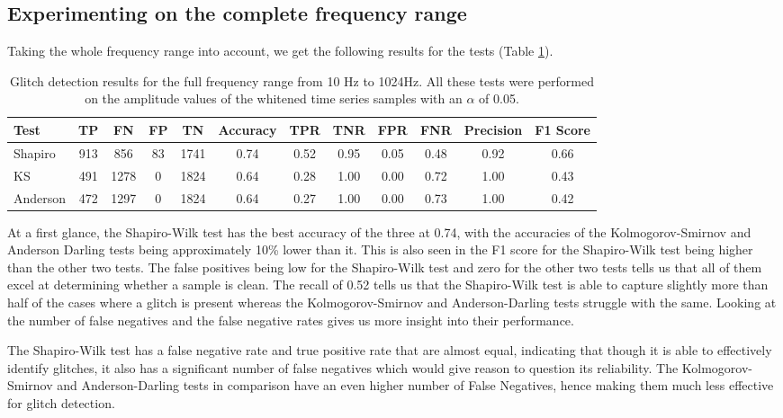 \documentclass[12pt]{article}
\begin{document}
\pagebreak

\subsection{Experimenting on the complete frequency range}\label{Experiment_1}

Taking the whole frequency range into account, we get the following results for the tests (Table \ref{tab:full_range_results}).

\begin{table}[H]
  \centering
  \begin{tabular}{lccccccccccc}
  \toprule
  Test & TP & FN & FP & TN & Accuracy & TPR & TNR & FPR & FNR & Precision & F1 Score \\
  \midrule
  Shapiro & 913 & 856 & 83 & 1741 & 0.74 & 0.52 & 0.95 & 0.05 & 0.48 & 0.92 & 0.66 \\
  KS & 491 & 1278 & 0 & 1824 & 0.64 & 0.28 & 1.00 & 0.00 & 0.72 & 1.00 & 0.43 \\
  Anderson & 472 & 1297 & 0 & 1824 & 0.64 & 0.27 & 1.00 & 0.00 & 0.73 & 1.00 & 0.42 \\
  \bottomrule
  \end{tabular}
  \caption{Glitch detection results for the full frequency range from 10 Hz to 1024Hz. All these tests were performed on the amplitude values of the whitened time series samples with an $\alpha$ of 0.05.}
  \label{tab:full_range_results}
\end{table}

\noindent At a first glance, the Shapiro-Wilk test has the best accuracy of the three at 0.74, with the accuracies of the Kolmogorov-Smirnov and Anderson Darling tests being approximately 10\% lower than it. This is also seen in the F1 score for the Shapiro-Wilk test being higher than the other two tests. The false positives being low for the Shapiro-Wilk test and zero for the other two tests tells us that all of them excel at determining whether a sample is clean. The recall of 0.52 tells us that the Shapiro-Wilk test is able to capture slightly more than half of the cases where a glitch is present whereas the Kolmogorov-Smirnov and Anderson-Darling tests struggle with the same. Looking at the number of false negatives and the false negative rates gives us more insight into their performance.

\medskip
\noindent The Shapiro-Wilk test has a false negative rate and true positive rate that are almost equal, indicating that though it is able to effectively identify glitches, it also has a significant number of false negatives which would give reason to question its reliability. The Kolmogorov-Smirnov and Anderson-Darling tests in comparison have an even higher number of False Negatives, hence making them much less effective for glitch detection.
\end{document}
